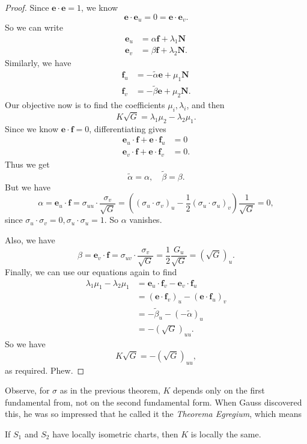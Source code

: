 \documentclass[a4paper]{article}
\begin{document}
\begin{proof}
  Since $\mathbf{e} \cdot \mathbf{e} = 1$, we know
  \[
    \mathbf{e}\cdot \mathbf{e}_u = 0 = \mathbf{e}\cdot \mathbf{e}_v.
  \]
  So we can write
  \begin{align*}
    \mathbf{e}_u &= \alpha \mathbf{f} + \lambda_1 \mathbf{N}\\
    \mathbf{e}_v &= \beta \mathbf{f} + \lambda_2 \mathbf{N}.
  \end{align*}
  Similarly, we have
  \begin{align*}
    \mathbf{f}_u &= -\tilde{\alpha}\mathbf{e} + \mu_1 \mathbf{N}\\
    \mathbf{f}_v &= -\tilde{\beta}\mathbf{e} + \mu_2 \mathbf{N}.
  \end{align*}
  Our objective now is to find the coefficients $\mu_i, \lambda_i$, and then
  \[
    K\sqrt{G} = \lambda_1 \mu_2 - \lambda_2 \mu_1.
  \]
  Since we know $\mathbf{e} \cdot \mathbf{f} = 0$, differentiating gives
  \begin{align*}
    \mathbf{e}_u \cdot \mathbf{f} + \mathbf{e}\cdot \mathbf{f}_u &= 0\\
    \mathbf{e}_v \cdot \mathbf{f} + \mathbf{e} \cdot \mathbf{f}_v &= 0.
  \end{align*}
  Thus we get
  \[
    \tilde{\alpha} = \alpha,\quad \tilde{\beta} = \beta.
  \]
  But we have
  \[
    \alpha = \mathbf{e}_u \cdot \mathbf{f} = \sigma_{uu}\cdot \frac{\sigma_v}{\sqrt{G}} = \left((\sigma_u \cdot \sigma_v)_u - \frac{1}{2} (\sigma_u \cdot \sigma_u)_v\right) \frac{1}{\sqrt{G}} = 0,
  \]
  since $\sigma_u \cdot \sigma_v = 0, \sigma_u \cdot \sigma_u = 1$. So $\alpha$ vanishes.

  Also, we have
  \[
    \beta = \mathbf{e}_v \cdot \mathbf{f} = \sigma_{uv} \cdot \frac{\sigma_v}{\sqrt{G}} = \frac{1}{2} \frac{G_u}{\sqrt{G}} = (\sqrt{G})_u.
  \]
  Finally, we can use our equations again to find
  \begin{align*}
    \lambda_1 \mu_1 - \lambda_2 \mu_1 &= \mathbf{e}_u \cdot \mathbf{f}_v - \mathbf{e}_v \cdot \mathbf{f}_u \\
    &= (\mathbf{e}\cdot \mathbf{f}_v)_u - (\mathbf{e}\cdot \mathbf{f}_u)_v \\
    &= -\tilde{\beta}_u - (-\tilde{\alpha})_u \\
    &= -(\sqrt{G})_{uu}.
  \end{align*}
  So we have
  \[
    K\sqrt{G} = -(\sqrt{G})_{uu},
  \]
  as required. Phew.
\end{proof}
Observe, for $\sigma$ as in the previous theorem, $K$ depends only on the first fundamental from, not on the second fundamental form. When Gauss discovered this, he was so impressed that he called it the \emph{Theorema Egregium}, which means
\begin{cor}
  If $S_1$ and $S_2$ have locally isometric charts, then $K$ is locally the same.
\end{cor}
\end{document}
